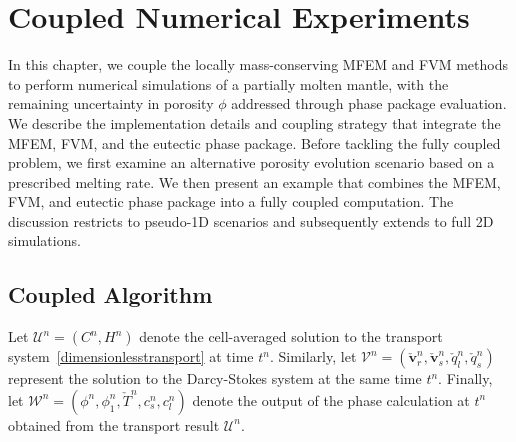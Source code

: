 
\chapter{Coupled Numerical Experiments}
\label{chap:coupled}

In this chapter, we couple the locally mass-conserving MFEM and FVM methods
to perform numerical simulations of a partially molten mantle, with the remaining uncertainty in 
porosity $\phi$ addressed through phase package evaluation.
We describe the implementation details and coupling strategy that integrate the MFEM,
FVM, and the eutectic phase package. Before tackling the fully coupled problem, we first examine an alternative
porosity evolution scenario based on a prescribed melting rate. We then 
present an example that combines the MFEM, FVM, and eutectic phase package
into a fully coupled computation. The discussion restricts to pseudo-1D
scenarios and subsequently extends to full 2D simulations.

\section{Coupled Algorithm}
\label{sec:coupledalgo}
Let $\mathcal{U}^n=(C^n, H^n)$ denote the cell-averaged solution to the transport system~\eqref{dimensionlesstransport} at time $t^n$. 
Similarly, let $\mathcal{V}^n=(\check{\mathbf{v}}_{r}^n,\check{\mathbf{v}}_{s}^n,\check{q}_{l}^n,\check{q}_s^n)$ 
represent the solution to the Darcy-Stokes system at the same time $t^n$. Finally, let 
$\mathcal{W}^n=(\phi^n, \phi_1^n, \check{T}^n, c_{s}^n, c_{l}^n)$ 
denote the output of the phase calculation at $t^n$ obtained from the transport result 
$\mathcal{U}^n$. 

